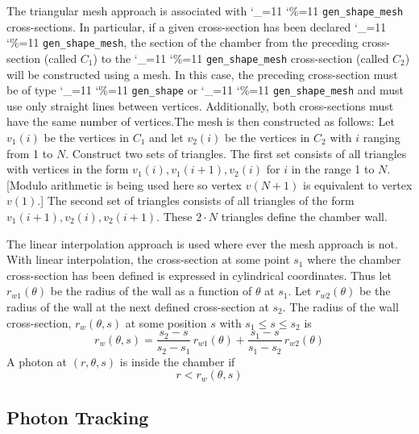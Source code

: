 \documentclass[11pt]{article}
\newcommand\ttcmd{\begingroup\catcode`\_=11 \catcode`\%=11 \dottcmd}
\newcommand\dottcmd[1]{\texttt{#1}\endgroup}
\newcommand{\Begineq}{\begin{equation}}
\newcommand{\Endeq}{\end{equation}}
\newcommand{\vn}{\ttcmd}
\begin{document}
{The triangular mesh approach is associated with \vn{gen_shape_mesh}
cross-sections. In particular, if a given cross-section has been
declared \vn{gen_shape_mesh}, the section of the chamber from the
preceding cross-section (called $C_1$) to the \vn{gen_shape_mesh}
cross-section (called $C_2$) will be constructed using a mesh. In this
case, the preceding cross-section must be of type \vn{gen_shape} or
\vn{gen_shape_mesh} and must use only straight lines between
vertices. Additionally, both cross-sections must have the same number
of vertices.The mesh is then constructed as follows: Let $v_1(i)$ be
the vertices in $C_1$ and let $v_2(i)$ be the vertices in $C_2$ with
$i$ ranging from 1 to $N$. Construct two sets of triangles. The first
set consists of all triangles with vertices in the form $v_1(i),
v_1(i+1), v_2(i)$ for $i$ in the range 1 to $N$. [Modulo arithmetic is
being used here so vertex $v(N+1)$ is equivalent to vertex $v(1)$.]
The second set of triangles consists of all triangles of the form
$v_1(i+1), v_2(i), v_2(i+1)$. These $2 \cdot N$ triangles define the
chamber wall.

The linear interpolation approach is used where ever the mesh approach
is not.  With linear interpolation, the cross-section at some point
$s_1$ where the chamber cross-section has been defined is expressed in
cylindrical coordinates.  Thus let $r_{w1}(\theta)$ be the radius of
the wall as a function of $\theta$ at $s_1$.  Let $r_{w2}(\theta)$ be
the radius of the wall at the next defined cross-section at $s_2$. The
radius of the wall cross-section, $r_w(\theta, s)$ at some position
$s$ with $s_1 \le s \le s_2$ is
\Begineq
  r_w(\theta, s) = 
  \frac{s_2 - s}{s_2 - s_1} \, r_{w1}(\theta) + 
  \frac{s_1 - s}{s_1 - s_2} \, r_{w2}(\theta)
\Endeq
A photon at $(r,\theta, s)$ is inside the chamber if
\Begineq
  r < r_w(\theta, s)
\Endeq

\subsection{Photon Tracking}
\label{s:track}

}
\end{document}
